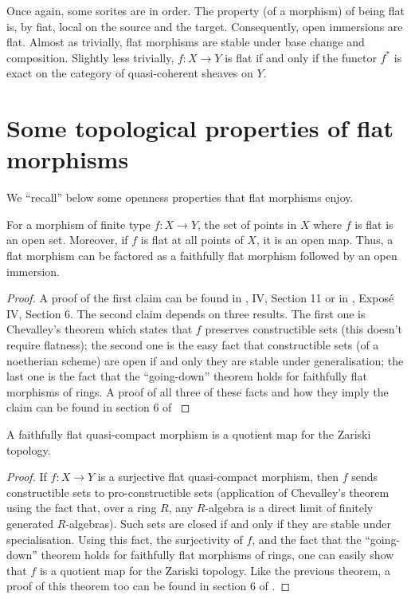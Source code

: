 \noindent
Once again, some sorites are in order. The property (of a morphism) of being
flat is, by fiat, local on the source and the target. Consequently, open
immersions are flat. Almost as trivially, flat morphisms are stable under
base change and composition. Slightly less trivially, $f:X \to Y$ is flat if
and only if the functor $f^*$ is exact on the category of quasi-coherent
sheaves on $Y$. 

\section{Some topological properties of flat morphisms}
\label{section-topological-flat}

\noindent
We ``recall'' below some openness properties that flat morphisms enjoy.

\begin{theorem}
\label{theorem-flat-open}
For a morphism of finite type $f:X \to Y$, the set of points in $X$ where $f$
is flat is an open set. Moreover, if $f$ is flat at all points of $X$, it is
an open map. Thus, a flat morphism can be factored as a faithfully flat
morphism followed by an open immersion.
\end{theorem}

\begin{proof}
A proof of the first claim can be found in \cite{EGA}, IV, Section 11 or in
\cite{SGA1}, Expos\'e IV, Section 6. The second claim depends on three
results. The first one is Chevalley's theorem which states that $f$ preserves
constructible sets (this doesn't require flatness); the second one is the
easy fact that constructible sets (of a noetherian scheme) are open if and
only they are stable under generalisation; the last one is the fact that the
``going-down'' theorem holds for faithfully flat morphisms of rings. A proof
of all three of these facts and how they imply the claim can be found in
section 6 of \cite{MatCA} 
\end{proof}

\begin{theorem}
\label{theorem-flat-is-quotient}
A faithfully flat quasi-compact morphism is a quotient map for
the Zariski topology.
\end{theorem}

\begin{proof}
If $f:X \to Y$ is a surjective flat quasi-compact morphism, then $f$ sends
constructible sets to pro-constructible sets (application of Chevalley's
theorem using the fact that, over a ring $R$, any $R$-algebra is a direct
limit of finitely generated $R$-algebras). Such sets are closed if and only
if they are stable under specialisation. Using this fact, the surjectivity
of $f$, and the fact that the ``going-down'' theorem holds for faithfully
flat morphisms of rings, one can easily show that $f$ is a quotient map for
the Zariski topology. Like the previous theorem, a proof of this theorem too
can be found in section 6 of \cite{MatCA}.
\end{proof}

